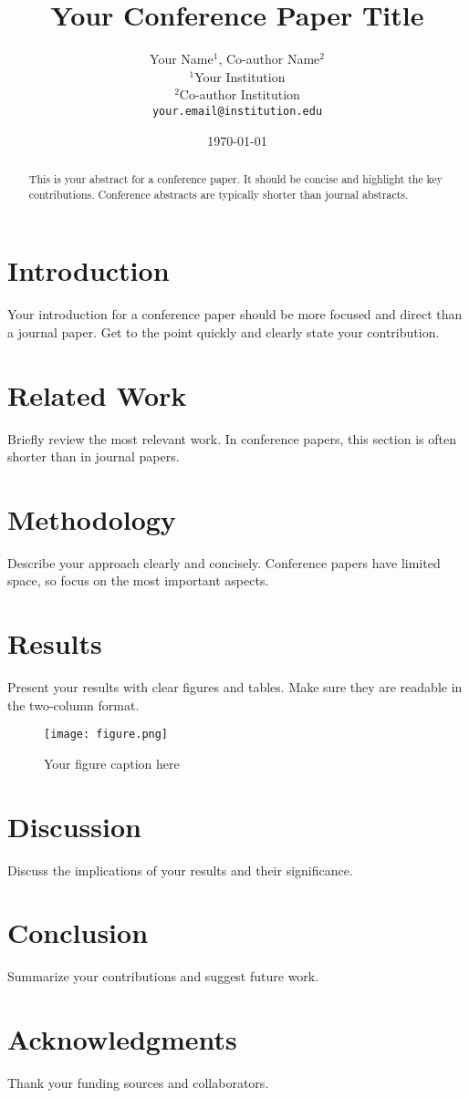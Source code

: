 \documentclass[10pt,twocolumn]{article}
\title{Your Conference Paper Title}
\author{Your Name$^1$, Co-author Name$^2$ \\
        $^1$Your Institution \\
        $^2$Co-author Institution \\
        \texttt{your.email@institution.edu}}
\date{\today}
\begin{document}
\maketitle

\begin{abstract}
This is your abstract for a conference paper. It should be concise and highlight the key contributions. Conference abstracts are typically shorter than journal abstracts.
\end{abstract}

\section{Introduction}
Your introduction for a conference paper should be more focused and direct than a journal paper. Get to the point quickly and clearly state your contribution.

\section{Related Work}
Briefly review the most relevant work. In conference papers, this section is often shorter than in journal papers.

\section{Methodology}
Describe your approach clearly and concisely. Conference papers have limited space, so focus on the most important aspects.

\section{Results}
Present your results with clear figures and tables. Make sure they are readable in the two-column format.

\begin{figure}[h]
\centering
\texttt{[image: figure.png]}
\caption{Your figure caption here}
\label{fig:example}
\end{figure}

\section{Discussion}
Discuss the implications of your results and their significance.

\section{Conclusion}
Summarize your contributions and suggest future work.

\section*{Acknowledgments}
Thank your funding sources and collaborators.




\balance
\end{document}
